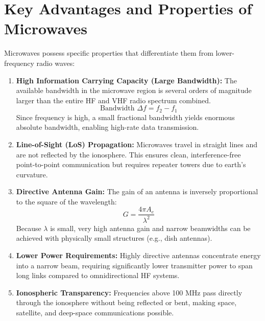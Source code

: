 \documentclass[12pt,a4paper]{article}
\begin{document}
\section{Key Advantages and Properties of Microwaves}

Microwaves possess specific properties that differentiate them from lower-frequency radio waves:

\begin{enumerate}[label=\textbf{\arabic*.}, leftmargin=*, itemsep=4pt]
  \item \textbf{High Information Carrying Capacity (Large Bandwidth):} The available bandwidth in the microwave region is several orders of magnitude larger than the entire HF and VHF radio spectrum combined.
    \begin{equation}
      \text{Bandwidth } \Delta f = f_2 - f_1
    \end{equation}
    Since frequency is high, a small fractional bandwidth yields enormous absolute bandwidth, enabling high-rate data transmission.
  \item \textbf{Line-of-Sight (LoS) Propagation:} Microwaves travel in straight lines and are not reflected by the ionosphere. This ensures clean, interference-free point-to-point communication but requires repeater towers due to earth's curvature.
  \item \textbf{Directive Antenna Gain:} The gain of an antenna is inversely proportional to the square of the wavelength:
    \begin{equation}
      G = \frac{4\pi A_e}{\lambda^2}
    \end{equation}
    Because $\lambda$ is small, very high antenna gain and narrow beamwidths can be achieved with physically small structures (e.g., dish antennas).
  \item \textbf{Lower Power Requirements:} Highly directive antennas concentrate energy into a narrow beam, requiring significantly lower transmitter power to span long links compared to omnidirectional HF systems.
  \item \textbf{Ionospheric Transparency:} Frequencies above 100 MHz pass directly through the ionosphere without being reflected or bent, making space, satellite, and deep-space communications possible.
\end{enumerate}

\end{document}
